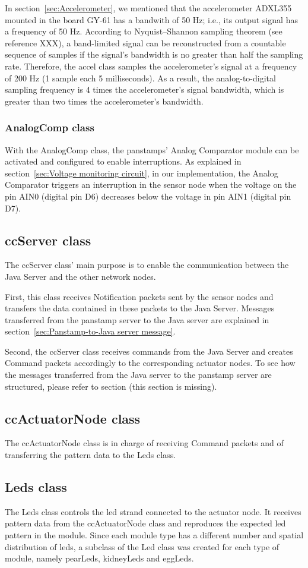 In section~\ref{sec:Accelerometer}, we mentioned that the accelerometer ADXL355 mounted in the board GY-61 has a bandwith of 50 Hz; i.e., its output signal has a frequency of 50 Hz. According to Nyquist–Shannon sampling theorem (see reference XXX), a band-limited signal can be reconstructed from a countable sequence of samples if the signal's bandwidth is no greater than half the sampling rate. Therefore, the accel class samples the accelerometer's signal at a frequency of 200 Hz (1 sample each 5 milliseconds). As a result, the analog-to-digital sampling frequency is 4 times the accelerometer's signal bandwidth, which is greater than two times the accelerometer's bandwidth. 

\subsubsection{AnalogComp class}
With the AnalogComp class, the panstamps' Analog Comparator module can be activated and configured to enable interruptions. As explained in section~\ref{sec:Voltage monitoring circuit}, in our implementation, the Analog Comparator triggers an interruption in the sensor node when the voltage on the pin AIN0 (digital pin D6) decreases below the voltage in pin AIN1 (digital pin D7). 

\subsection{ccServer class}
The ccServer class' main purpose is to enable the communication between the Java Server and the other network nodes. 

First, this class receives Notification packets sent by the sensor nodes and transfers the data contained in these packets to the Java Server. Messages transferred from the panstamp server to the Java server are explained in section~\ref{sec:Panstamp-to-Java server message}. 

Second, the ccServer class receives commands from the Java Server and creates Command packets accordingly to the corresponding actuator nodes. To see how the messages transferred from the Java server to the panstamp server are structured, please refer to section (this section is missing). 

\subsection{ccActuatorNode class}	
The ccActuatorNode class is in charge of receiving Command packets and of transferring the pattern data to the Leds class.  			

\subsection{Leds class}	
The Leds class controls the led strand connected to the actuator node. It receives pattern data from the ccActuatorNode class and reproduces the expected led pattern in the module. Since each module type has a different number and spatial distribution of leds, a subclass of the Led class was created for each type of module, namely pearLeds, kidneyLeds and eggLeds. 




